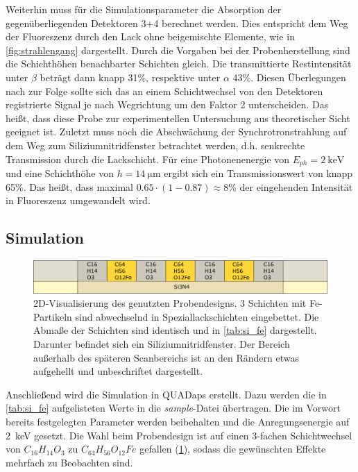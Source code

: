 Weiterhin muss für die Simulationsparameter die Absorption der gegenüberliegenden Detektoren 3+4 berechnet werden. Dies entspricht dem Weg der Fluoreszenz durch den Lack ohne beigemischte Elemente, wie in \cref{fig:strahlengang} dargestellt. Durch die Vorgaben bei der Probenherstellung sind die Schichthöhen benachbarter Schichten gleich. Die transmittierte Restintensität unter $\beta$ beträgt dann knapp 31\%, respektive unter $\alpha$ 43\%. Diesen Überlegungen nach zur Folge sollte sich das an einem Schichtwechsel von den Detektoren registrierte Signal je nach Wegrichtung um den Faktor 2 unterscheiden. Das heißt, dass diese Probe zur experimentellen Untersuchung aus theoretischer Sicht geeignet ist. \newlines
Zuletzt muss noch die Abschwächung der Synchrotronstrahlung auf dem Weg zum Siliziumnitridfenster betrachtet werden, d.h. senkrechte Transmission durch die Lackschicht. Für eine Photonenenergie von $E_{ph} = \SI{2}{\kilo\electronvolt}$ und eine Schichthöhe von $h = \SI{14}{\micro\meter}$ ergibt sich ein Transmissionswert von knapp 65\%. Das heißt, dass maximal $0.65 \cdot (1-0.87) \approx 8\%$ der eingehenden Intensität in Fluoreszenz umgewandelt wird. 

\subsection{Simulation} \label{sec:si_sim}

\begin{figure}[H] 
  \centering
     \includegraphics[width=1\textwidth]{illustrations/siliziumfenster.png}
  \caption[Probendesign Siliziumkante]{2D-Visualisierung des genutzten Probendesigns. 3 Schichten mit Fe-Partikeln sind abwechselnd in Speziallackschichten eingebettet. Die Abmaße der Schichten sind identisch und in \cref{tab:si_fe} dargestellt. Darunter befindet sich ein Siliziumnitridfenster. Der Bereich außerhalb des späteren Scanbereichs ist an den Rändern etwas aufgehellt und unbeschriftet dargestellt.}
  \label{fig:siliziumfenster}
\end{figure}

Anschließend wird die Simulation in QUADaps erstellt. Dazu werden die in \cref{tab:si_fe} aufgelisteten Werte in die \textit{sample}-Datei übertragen. Die im Vorwort bereits festgelegten Parameter werden beibehalten und die Anregungsenergie auf \SI{2}{\kilo\electronvolt} gesetzt. Die Wahl beim Probendesign ist auf einen 3-fachen Schichtwechsel von $C_{16}H_{14}O_{3}$ zu 
$C_{64}H_{56}O_{12}Fe$ gefallen (\cref{fig:siliziumfenster}), sodass die gewünschten Effekte mehrfach zu Beobachten sind. 

